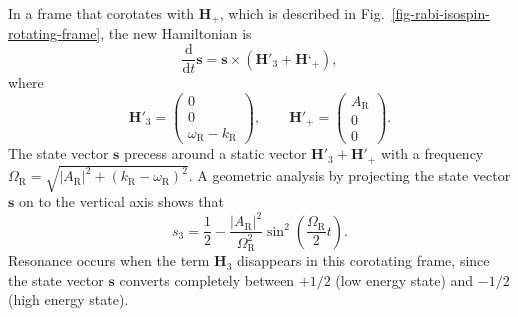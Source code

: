 In a frame that corotates with $\mathbf{H}_+$, which is described in Fig.~\ref{fig-rabi-isospin-rotating-frame}, the new Hamiltonian is
\begin{equation}
\frac{\mathrm d}{\mathrm d t } \mathbf{s} = \mathbf{s} \times (\mathbf{H}'_3 + \mathbf{H}‘_+),
\end{equation}
where
\begin{equation}
\mathbf{H}'_3 = \begin{pmatrix}
    0 \\ 0 \\ 　\omega_{\mathrm{R}} - k_{\mathrm R}
    \end{pmatrix}, \qquad \mathbf{H}'_+ = \begin{pmatrix}
    A_{\mathrm{R}} \\ 0 \\ 　0
    \end{pmatrix}.
\end{equation}
The state vector $\mathbf{s}$ precess around a static vector $\mathbf{H}'_3 + \mathbf{H}'_+$ with a frequency $\Omega_{\mathrm R} = \sqrt{ \lvert A_{\mathrm{R}}\rvert^2 + (k_{\mathrm{R}} - \omega_{\mathrm R})^2 }$. A geometric analysis by projecting the state vector $\mathbf{s}$ on to the vertical axis shows that
\begin{equation}
s_3 = \frac{1}{2} - \frac{\lvert A_{\mathrm R}\rvert ^2}{\Omega_{\mathrm R}^2}\sin^2\left(\frac{\Omega_{\mathrm R}}{2} t\right).
\end{equation}
Resonance occurs when the term $\mathbf{H}_3$ disappears in this corotating frame, since the state vector $\mathbf{s}$ converts completely between $+1/2$ (low energy state) and $-1/2$ (high energy state).



